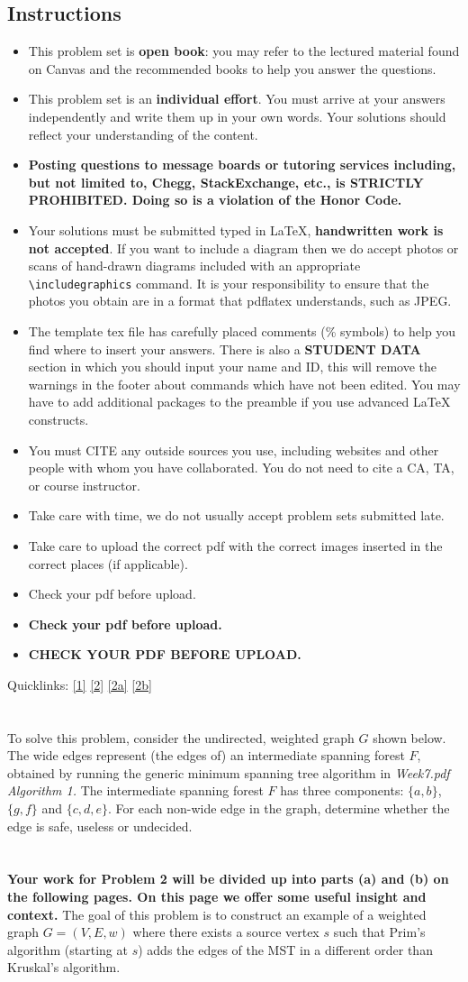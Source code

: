 \documentclass[12pt,letterpaper]{article}
\makeatletter
\theoremstyle{definition}
\newcommand*{\problem}{\section{}}
\newcommand*{\skippagesuntil}[1]{\whileboolexpr{test {\ifnumless{\thepage}{#1}}}{\mbox{}\clearpage}}
\newcommand{\problemend}{\par\noindent{\hspace{0.15\textwidth}\rule{0.7\textwidth}{0.5pt}\hspace{0.15\textwidth}}\par}
\newcommand{\psinstructions}{%
\subsection*{Instructions} 
\begin{itemize}
	\item 
	This problem set is \textbf{open book}: you may refer to the lectured material found on Canvas and the recommended books to help you answer the questions.
	\item 
	This problem set is an \textbf{individual effort}. You must arrive at your answers independently and write them up in your own words. Your solutions should reflect your understanding of the content.
	\item 
	\textbf{Posting questions to message boards or tutoring services including, but not limited to, Chegg, StackExchange, etc., is STRICTLY PROHIBITED. Doing so is a violation of the Honor Code.}
	\item
	Your solutions must be submitted typed in \LaTeX{}, \textbf{handwritten work is not accepted}. 
	If you want to include a diagram then we do accept photos or scans of hand-drawn diagrams included with an appropriate \texttt{\textbackslash{}includegraphics} command. It is your responsibility to ensure that the photos you obtain are in a format that pdflatex understands, such as JPEG\@. 
	\item 
	The template tex file has carefully placed comments (\%{} symbols) to help you find where to insert your answers. There is also a \textbf{STUDENT DATA} section in which you should input your name and ID, this will remove the warnings in the footer about commands which have not been edited. You may have to add additional packages to the preamble if you use advanced \LaTeX{} constructs. 
	\item 
	You must CITE any outside sources you use, including websites and other people with whom you have collaborated. You do not need to cite a CA, TA, or course instructor.
	\item Take care with time, we do not usually accept problem sets submitted late.
	\item Take care to upload the correct pdf with the correct images inserted in the correct places (if applicable).
	\item Check your pdf before upload.
	\item \textbf{Check your pdf before upload.}
	\item \textbf{CHECK YOUR PDF BEFORE UPLOAD.}
  \end{itemize}}
\makeatother
\begin{document}
\psinstructions{}

Quicklinks: \ref{1} \ref{2} \ref{2a} \ref{2b}

\clearpage
\problem{}\label{1}
To solve this problem, consider the undirected, weighted graph $G$ shown below. The wide edges represent (the edges of) an intermediate spanning forest $F$, obtained by running the generic minimum spanning tree algorithm in \emph{Week7.pdf Algorithm 1.} The intermediate spanning forest $F$ has three components: $\{a,b\}$, $\{g,f\}$ and $\{c,d,e\}$.
For each non-wide edge in the graph, determine whether the edge is safe, useless or undecided.   
\begin{center}
\end{center}
\problemend{}


\skippagesuntil{4}
\problem{}\label{2}
\textbf{Your work for Problem 2 will be divided up into parts (a) and (b) on the following pages. On this page we offer some useful insight and context.} The goal of this problem is to construct an example of a weighted graph $G=(V, E, w)$ where there exists a source vertex $s$ such that Prim's algorithm (starting at $s$) adds the edges of the MST in a different order than Kruskal's algorithm. 
\end{document}
